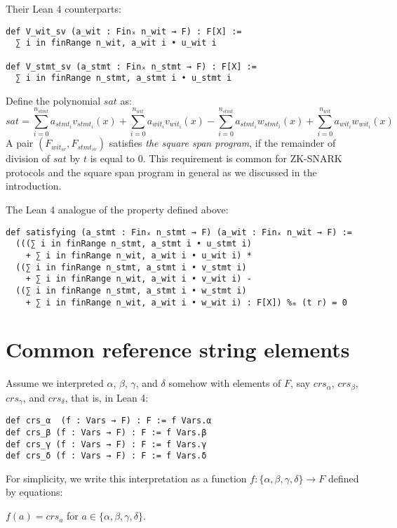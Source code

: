 \documentclass{article}
\theoremstyle{definition}
\theoremstyle{remark}
\begin{document}
Their Lean 4 counterparts:
\begin{lstlisting}
def V_wit_sv (a_wit : Finₓ n_wit → F) : F[X] :=
  ∑ i in finRange n_wit, a_wit i • u_wit i

def V_stmt_sv (a_stmt : Finₓ n_stmt → F) : F[X] :=
  ∑ i in finRange n_stmt, a_stmt i • u_stmt i
\end{lstlisting}

Define the polynomial $sat$ as:
\begin{equation}
sat = \sum \limits_{i = 0}^{n_{stmt}} a_{{stmt}_i} v_{{stmt}_i}(x) + \sum \limits_{i = 0}^{n_{wit}} a_{{wit}_i} v_{{wit}_i}(x) - \sum \limits_{i = 0}^{n_{stmt}} a_{{stmt}_i} w_{{stmt}_i}(x) + \sum \limits_{i = 0}^{n_{wit}} a_{{wit}_i} w_{{wit}_i}(x)
\end{equation}
A pair $(F_{{wit}_{sv}}, F_{{stmt}_{sv}})$ satisfies \emph{the square span program},
if the remainder of division of $sat$ by $t$ is equal to $0$.
This requirement is common for ZK-SNARK protocols and the square span program in general as we discussed in the introduction.

The Lean 4 analogue of the property defined above:
\begin{lstlisting}
def satisfying (a_stmt : Finₓ n_stmt → F) (a_wit : Finₓ n_wit → F) :=
  (((∑ i in finRange n_stmt, a_stmt i • u_stmt i)
    + ∑ i in finRange n_wit, a_wit i • u_wit i) *
  ((∑ i in finRange n_stmt, a_stmt i • v_stmt i)
    + ∑ i in finRange n_wit, a_wit i • v_wit i) -
  ((∑ i in finRange n_stmt, a_stmt i • w_stmt i)
    + ∑ i in finRange n_wit, a_wit i • w_wit i) : F[X]) %ₘ (t r) = 0
\end{lstlisting}

\section{Common reference string elements}

Assume we interpreted $\alpha$, $\beta$, $\gamma$, and $\delta$ somehow with elements of $F$, say $crs_{\alpha}$, $crs_{\beta}$, $crs_{\gamma}$, and $crs_{\delta}$, that is, in Lean 4:

\begin{lstlisting}
def crs_α  (f : Vars → F) : F := f Vars.α
def crs_β (f : Vars → F) : F := f Vars.β
def crs_γ (f : Vars → F) : F := f Vars.γ
def crs_δ (f : Vars → F) : F := f Vars.δ
\end{lstlisting}

For simplicity, we write this interpretation as a function $f :  \{ \alpha,\beta,\gamma, \delta \} \to F$ defined by equations:
\begin{center}
$f(a) = crs_{a}$ for $a \in \{ \alpha,\beta,\gamma, \delta \}$.
\end{center}
\end{document}
